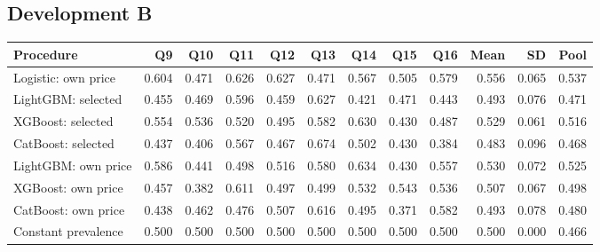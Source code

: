 \subsection*{Development B}
\begingroup\scriptsize\setlength{\tabcolsep}{2.5pt}
\begin{longtable}{@{}p{.26\linewidth}rrrrrrrrrrr@{}}\toprule
Procedure & Q9 & Q10 & Q11 & Q12 & Q13 & Q14 & Q15 & Q16 & Mean & SD & Pool\\\midrule\endhead
Logistic: own price & 0.604 & 0.471 & 0.626 & 0.627 & 0.471 & 0.567 & 0.505 & 0.579 & 0.556 & 0.065 & 0.537\\
LightGBM: selected & 0.455 & 0.469 & 0.596 & 0.459 & 0.627 & 0.421 & 0.471 & 0.443 & 0.493 & 0.076 & 0.471\\
XGBoost: selected & 0.554 & 0.536 & 0.520 & 0.495 & 0.582 & 0.630 & 0.430 & 0.487 & 0.529 & 0.061 & 0.516\\
CatBoost: selected & 0.437 & 0.406 & 0.567 & 0.467 & 0.674 & 0.502 & 0.430 & 0.384 & 0.483 & 0.096 & 0.468\\
LightGBM: own price & 0.586 & 0.441 & 0.498 & 0.516 & 0.580 & 0.634 & 0.430 & 0.557 & 0.530 & 0.072 & 0.525\\
XGBoost: own price & 0.457 & 0.382 & 0.611 & 0.497 & 0.499 & 0.532 & 0.543 & 0.536 & 0.507 & 0.067 & 0.498\\
CatBoost: own price & 0.438 & 0.462 & 0.476 & 0.507 & 0.616 & 0.495 & 0.371 & 0.582 & 0.493 & 0.078 & 0.480\\
Constant prevalence & 0.500 & 0.500 & 0.500 & 0.500 & 0.500 & 0.500 & 0.500 & 0.500 & 0.500 & 0.000 & 0.466\\
\bottomrule\end{longtable}\endgroup
